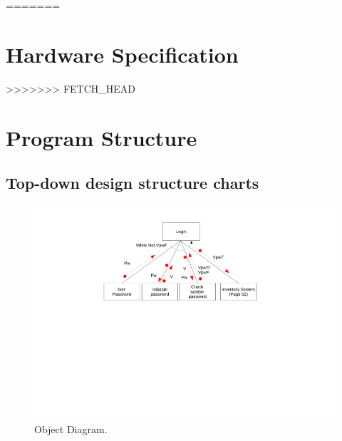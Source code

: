 \begin{landscape}

=======
\section{Hardware Specification}

>>>>>>> FETCH_HEAD
\section{Program Structure}

\subsection{Top-down design structure charts}

\begin{figure}[H]
    \begin{center}
    \includegraphics[width=500px]{./Design/top_down_design/Top_down_design.pdf}
    \caption{Object Diagram.} \label{fig:object_diagram}
    \end{center}
\end{figure}

\newpage


\end{landscape}
